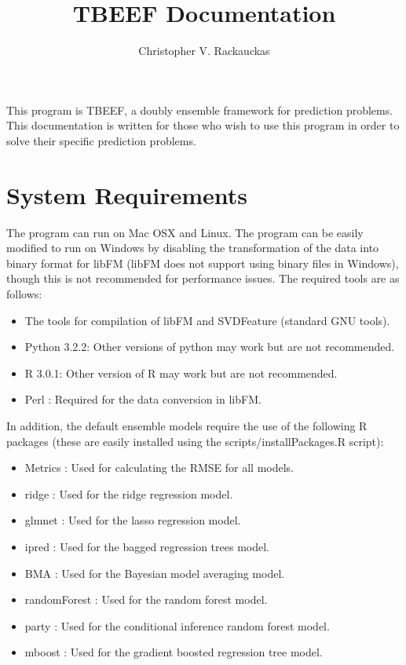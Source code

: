 \documentclass{article}
\title{TBEEF Documentation}
\author{Christopher V. Rackauckas}
\begin{document}
\maketitle

This program is TBEEF, a doubly ensemble framework for prediction problems. This documentation is written for those who wish to use this program in order to solve their specific prediction problems.

\section{System Requirements}

The program can run on Mac OSX and Linux. The program can be easily modified to run on Windows by disabling the transformation of the data into binary format for libFM (libFM does not support using binary files in Windows), though this is not recommended for performance issues. The required tools are as follows:

\begin{itemize}
\item The tools for compilation of libFM and SVDFeature (standard GNU tools).
\item Python 3.2.2: Other versions of python may work but are not recommended.
\item R 3.0.1: Other version of R may work but are not recommended.
\item Perl : Required for the data conversion in libFM.
\end{itemize}

In addition, the default ensemble models require the use of the following R packages (these are easily installed using the scripts/installPackages.R script):

\begin{itemize}
\item Metrics : Used for calculating the RMSE for all models.
\item ridge : Used for the ridge regression model.
\item glmnet : Used for the lasso regression model.
\item ipred : Used for the bagged regression trees model.
\item BMA : Used for the Bayesian model averaging model.
\item randomForest : Used for the random forest model.
\item party : Used for the conditional inference random forest model.
\item mboost : Used for the gradient boosted regression tree model.
\end{itemize}
\end{document}
